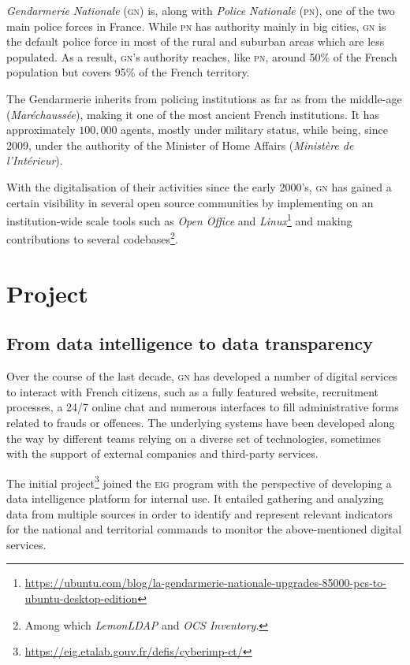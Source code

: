 \documentclass[11pt,a4paper,twocolumn,USenglish]{article}
\begin{document}
\emph{Gendarmerie Nationale} (\textsc{gn}) is, along with \emph{Police Nationale} (\textsc{pn}), one of the two main police forces in France. While \textsc{pn} has authority mainly in big cities, \textsc{gn} is the default police force in most of the rural and suburban areas which are less populated. As a result, \textsc{gn}'s authority reaches, like \textsc{pn}, around 50\% of the French population but covers 95\% of the French territory.

The Gendarmerie inherits from policing institutions as far as from the middle-age (\emph{Maréchaussée}), making it one of the most ancient French institutions. It has approximately $100,000$ agents, mostly under military status, while being, since 2009, under the authority of the Minister of Home Affairs (\emph{Ministère de l'Intérieur}).

With the digitalisation of their activities since the early 2000's, \textsc{gn} has gained a certain visibility in several open source communities by implementing on an institution-wide scale tools such as \emph{Open Office} and \emph{Linux}\footnote{\url{https://ubuntu.com/blog/la-gendarmerie-nationale-upgrades-85000-pcs-to-ubuntu-desktop-edition}} and making contributions to several codebases\footnote{Among which \emph{LemonLDAP} and \emph{OCS Inventory}.}.


\section*{Project}

\subsection*{From data intelligence to data transparency}

Over the course of the last decade, \textsc{gn} has developed a number of digital services to interact with French citizens, such as a fully featured website, recruitment processes, a 24/7 online chat and numerous interfaces to fill administrative forms related to frauds or offences. The underlying systems have been developed along the way by different teams relying on a diverse set of technologies, sometimes with the support of external companies and third-party services.

The initial project\footnote{\url{https://eig.etalab.gouv.fr/defis/cyberimp-ct/}} joined the \textsc{eig} program with the perspective of developing a data intelligence platform for internal use. It entailed gathering and analyzing data from multiple sources in order to identify and represent relevant indicators for the national and territorial commands to monitor the above-mentioned digital services.
\end{document}
